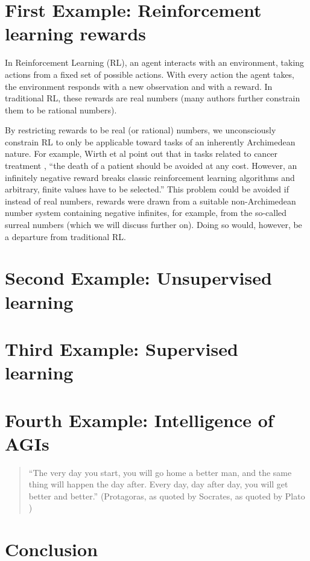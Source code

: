\documentclass[reqno]{article}
\theoremstyle{definition}
\begin{document}
\section{First Example: Reinforcement learning rewards}

In Reinforcement Learning (RL), an agent interacts with an environment,
taking actions from a fixed set of possible actions. With every action the
agent takes, the environment responds with a new observation and with a
reward. In traditional RL, these rewards are real numbers (many
authors further constrain them to be rational numbers).

By restricting rewards to be real (or rational) numbers, we unconsciously
constrain RL to only be applicable toward tasks of an inherently Archimedean
nature. For example, Wirth et al point out \cite{wirth2017survey} that
in tasks related to cancer treatment \cite{zhao2009reinforcement},
``the death of a patient should be avoided at any cost. However, an
infinitely negative reward breaks classic reinforcement learning algorithms
and arbitrary, finite values have to be selected.'' This problem could be
avoided if instead of real numbers, rewards were drawn from a suitable
non-Archimedean number system containing negative infinites,
for example, from the so-called
surreal numbers (which we will discuss further on). Doing so would, however,
be a departure from traditional RL.



\section{Second Example: Unsupervised learning}

\section{Third Example: Supervised learning}

\section{Fourth Example: Intelligence of AGIs}

\begin{quote}
    ``The very day you start, you will go home a better man,
    and the same thing will happen the day after. Every day,
    day after day, you will get better and better.''
    (Protagoras, as quoted by Socrates, as quoted by Plato \cite{protagoras})
\end{quote}

\section{Conclusion}



\end{document}
